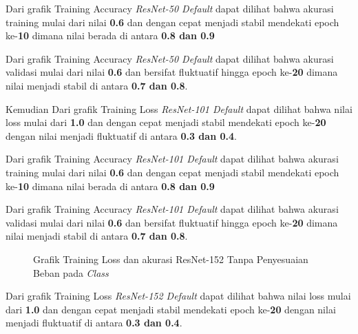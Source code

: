 Dari grafik Training Accuracy \emph{ResNet-50 Default} dapat dilihat bahwa akurasi training mulai dari nilai \textbf{0.6} dan dengan cepat menjadi stabil mendekati epoch ke-\textbf{10} dimana nilai berada di antara \textbf{0.8 dan 0.9} 

Dari grafik Training Accuracy \emph{ResNet-50 Default} dapat dilihat bahwa akurasi validasi mulai dari nilai \textbf{0.6} dan bersifat fluktuatif hingga epoch ke-\textbf{20} dimana nilai menjadi stabil di antara \textbf{0.7 dan 0.8}.

Kemudian Dari grafik Training Loss \emph{ResNet-101 Default} dapat dilihat bahwa nilai loss mulai dari \textbf{1.0} dan dengan cepat menjadi stabil mendekati epoch ke-\textbf{20} dengan nilai menjadi fluktuatif di antara \textbf{0.3 dan 0.4}.

Dari grafik Training Accuracy \emph{ResNet-101 Default} dapat dilihat bahwa akurasi training mulai dari nilai \textbf{0.6} dan dengan cepat menjadi stabil mendekati epoch ke-\textbf{10} dimana nilai berada di antara \textbf{0.8 dan 0.9} 

Dari grafik Training Accuracy \emph{ResNet-101 Default} dapat dilihat bahwa akurasi validasi mulai dari nilai \textbf{0.6} dan bersifat fluktuatif hingga epoch ke-\textbf{20} dimana nilai menjadi stabil di antara \textbf{0.7 dan 0.8}.

\begin{figure}[hbtp]
	\caption{Grafik Training Loss dan akurasi ResNet-152 Tanpa Penyesuaian Beban pada \emph{Class}}
	\label{Fig:GraphTrainingDefPt3}
\end{figure}
Dari grafik Training Loss \emph{ResNet-152 Default} dapat dilihat bahwa nilai loss mulai dari \textbf{1.0} dan dengan cepat menjadi stabil mendekati epoch ke-\textbf{20} dengan nilai menjadi fluktuatif di antara \textbf{0.3 dan 0.4}.

